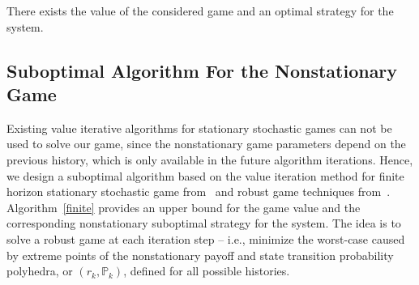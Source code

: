 \begin{theorem} 
There exists the value of the considered game and an optimal strategy for the system.
\end{theorem}

\iffalse
The game we define in this paper has properties: (i) for any stage k, the state space S, action space $A_{tk}$ for attacker and $A_{sk}$ for system are finite sets.   (ii) The state transition probability matrix $\tilde{P}^{k}(s_{h}|h_{k}, s_{l})$ together with the strategy history $h_{k}$ defines a conditional distribution for computing the expected total payoff. %
(iii) The immediate payoff $\tilde{r}^{k} (h_{k},s_{l})$ is nonnegative, and conditional expected total payoff function $R_{k}(s,\mathbf{f,g}): H_{K} \to R$ is a bounded below (nonnegative), nondecreasing, for $k\in\{1,\cdots,K\}$. %
The game formulation in this paper can be interpreted by the abstract nonstationary game model in~\cite{finite_exist}, and a detail proof is provided in~\cite{finite_exist}.
\fi




\subsection{Suboptimal Algorithm For the Nonstationary Game}

Existing value iterative algorithms for stationary stochastic games can not be used to solve our game, since the nonstationary game parameters depend on the previous history, which is only available in the future algorithm iterations.
Hence, we design a suboptimal algorithm based on the  value iteration method for finite horizon stationary stochastic game from~\cite{plangame} and robust game techniques from~\cite{RGT}. 
Algorithm~\ref{finite} provides an upper bound for the game value and the corresponding nonstationary suboptimal strategy for the system. The idea is to solve a robust game at each iteration step -- i.e., minimize the worst-case caused by extreme points of the nonstationary payoff and state transition probability polyhedra, or $(r_{k},\mathbb{P}_{k})$, defined for all possible histories. 

